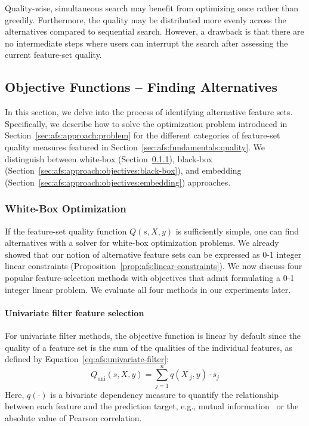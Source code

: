 \documentclass[iicol, sn-basic, Numbered]{sn-jnl} %
\theoremstyle{plain}
\theoremstyle{definition}
\begin{document}
Quality-wise, simultaneous search may benefit from optimizing once rather than greedily.
Furthermore, the quality may be distributed more evenly across the alternatives compared to sequential search.
However, a drawback is that there are no intermediate steps where users can interrupt the search after assessing the current feature-set quality.

\subsection{Objective Functions -- Finding Alternatives}
\label{sec:afs:approach:objectives}

In this section, we delve into the process of identifying alternative feature sets.
Specifically, we describe how to solve the optimization problem introduced in Section~\ref{sec:afs:approach:problem} for the different categories of feature-set quality measures featured in Section~\ref{sec:afs:fundamentals:quality}.
We distinguish between white-box (Section~\ref{sec:afs:approach:objectives:white-box}), black-box (Section~\ref{sec:afs:approach:objectives:black-box}), and embedding (Section~\ref{sec:afs:approach:objectives:embedding}) approaches.

\subsubsection{White-Box Optimization}
\label{sec:afs:approach:objectives:white-box}

If the feature-set quality function $Q(s,X,y)$ is sufficiently simple, one can find alternatives with a solver for white-box optimization problems.
We already showed that our notion of alternative feature sets can be expressed as 0-1 integer linear constraints (Proposition~\ref{prop:afs:linear-constraints}).
We now discuss four popular feature-selection methods with objectives that admit formulating a 0-1 integer linear problem.
We evaluate all four methods in our experiments later.

\paragraph{Univariate filter feature selection}

For univariate filter methods, the objective function is linear by default since the quality of a feature set is the sum of the qualities of the individual features, as defined by Equation~\ref{eq:afs:univariate-filter}:
%
\begin{equation}
	Q_{\text{uni}}(s,X,y) = \sum_{j=1}^{n} q(X_{\cdot{}j},y) \cdot s_j
	\label{eq:afs:univariate-filter}
\end{equation}
%
Here, $q(\cdot)$ is a bivariate dependency measure to quantify the relationship between each feature and the prediction target, e.g., mutual information~\cite{kraskov2004estimating} or the absolute value of Pearson correlation.
\end{document}
